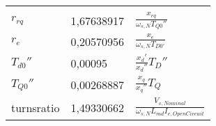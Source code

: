 \begin{longtable}[]{@{}lll@{}}
\begin{minipage}[t]{0.56\columnwidth}
\end{minipage}\tabularnewline
\begin{minipage}[t]{0.11\columnwidth}\raggedright
\(r_{rq}\)\strut
\end{minipage} & \begin{minipage}[t]{0.24\columnwidth}\raggedright
1,67638917\strut
\end{minipage} & \begin{minipage}[t]{0.56\columnwidth}\raggedright
\(\frac{x_{rq}}{\omega_{s,N}T_{Q0}''}\)\strut
\end{minipage}\tabularnewline
\begin{minipage}[t]{0.11\columnwidth}\raggedright
\(r_e\)\strut
\end{minipage} & \begin{minipage}[t]{0.24\columnwidth}\raggedright
0,20570956\strut
\end{minipage} & \begin{minipage}[t]{0.56\columnwidth}\raggedright
\(\frac{x_e}{\omega_{s,N}T_{D0'}}\)\strut
\end{minipage}\tabularnewline
\begin{minipage}[t]{0.11\columnwidth}\raggedright
\(T_{d0}''\)\strut
\end{minipage} & \begin{minipage}[t]{0.24\columnwidth}\raggedright
0,00095\strut
\end{minipage} & \begin{minipage}[t]{0.56\columnwidth}\raggedright
\(\frac{x_d'}{x_d''}T_D''\)\strut
\end{minipage}\tabularnewline
\begin{minipage}[t]{0.11\columnwidth}\raggedright
\(T_{Q0}''\)\strut
\end{minipage} & \begin{minipage}[t]{0.24\columnwidth}\raggedright
0,00268887\strut
\end{minipage} & \begin{minipage}[t]{0.56\columnwidth}\raggedright
\(\frac{x_q}{x_q''}T_Q\)\strut
\end{minipage}\tabularnewline
\begin{minipage}[t]{0.11\columnwidth}\raggedright
turnsratio\strut
\end{minipage} & \begin{minipage}[t]{0.24\columnwidth}\raggedright
1,49330662\strut
\end{minipage} & \begin{minipage}[t]{0.56\columnwidth}\raggedright
\(\frac{V_{s,Nominal}}{\omega_{s,N}L_{md}I_{e,OpenCircuit}}\)\strut
\end{minipage}\tabularnewline
\bottomrule
\end{longtable}

